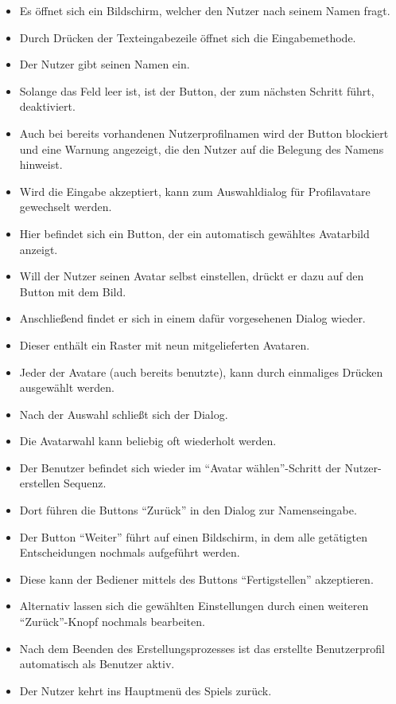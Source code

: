 \begin{itemize}
\item Es öffnet sich ein Bildschirm, welcher den Nutzer nach seinem Namen fragt.
\item Durch Drücken der Texteingabezeile öffnet sich die Eingabemethode.
\item Der Nutzer gibt seinen Namen ein. 
\item Solange das Feld leer ist, ist der Button, der zum nächsten Schritt führt, deaktiviert.
\item  Auch bei bereits vorhandenen Nutzerprofilnamen wird der Button blockiert und eine Warnung angezeigt,
die den Nutzer auf die Belegung des Namens hinweist. 
\item Wird die Eingabe akzeptiert, kann zum Auswahldialog für Profilavatare gewechselt werden.
\item Hier befindet sich ein Button, der ein automatisch gewähltes Avatarbild anzeigt.
\item Will der Nutzer seinen Avatar selbst einstellen, drückt er dazu auf den Button mit dem Bild.
\item Anschließend findet er sich in einem dafür vorgesehenen Dialog wieder.
\item Dieser enthält ein Raster mit neun mitgelieferten Avataren.
\item Jeder der Avatare (auch bereits benutzte), kann durch einmaliges Drücken ausgewählt werden.
\item Nach der Auswahl schließt sich der Dialog.
\item Die Avatarwahl kann beliebig oft wiederholt werden.
\item Der Benutzer befindet sich wieder im "`Avatar wählen"'-Schritt der Nutzer-erstellen Sequenz.
\item Dort führen die Buttons "`Zurück"' in den Dialog zur Namenseingabe.
\item Der Button "`Weiter"' führt auf einen Bildschirm, in dem alle getätigten Entscheidungen
nochmals aufgeführt werden. 
\item Diese kann der Bediener mittels des Buttons "`Fertigstellen"' akzeptieren.
\item Alternativ lassen sich die gewählten Einstellungen durch einen weiteren "`Zurück"'-Knopf 
nochmals bearbeiten.
\item Nach dem Beenden des Erstellungsprozesses ist das erstellte 
Benutzerprofil automatisch als Benutzer aktiv.
\item Der Nutzer kehrt ins Hauptmenü des Spiels zurück.
\end{itemize}
